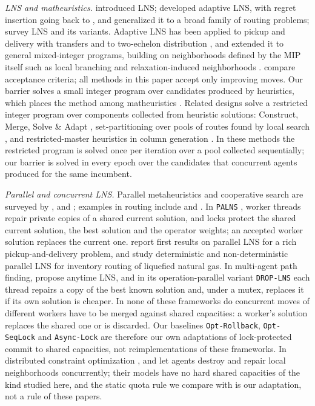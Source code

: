 \documentclass[a4paper,fleqn]{cas-sc}
\begin{document}
\textit{LNS and matheuristics.} \citet{shaw1998} introduced LNS; \citet{ropke2006} developed adaptive LNS, with regret insertion going back to \citet{potvin1993}, and \citet{pisinger2007} generalized it to a broad family of routing problems; \citet{pisinger2010} survey LNS and its variants. Adaptive LNS has been applied to pickup and delivery with transfers \citep{masson2013} and to two-echelon distribution \citep{hemmelmayr2012}, and \citet{hendel2022} extended it to general mixed-integer programs, building on neighborhoods defined by the MIP itself such as local branching \citep{fischetti2003} and relaxation-induced neighborhoods \citep{danna2005}. \citet{santini2018} compare acceptance criteria; all methods in this paper accept only improving moves. Our barrier solves a small integer program over candidates produced by heuristics, which places the method among matheuristics \citep{maniezzo2009}. Related designs solve a restricted integer program over components collected from heuristic solutions: Construct, Merge, Solve \& Adapt \citep{blum2016}, set-partitioning over pools of routes found by local search \citep{subramanian2013}, and restricted-master heuristics in column generation \citep{joncour2010, sadykov2019}. In these methods the restricted program is solved once per iteration over a pool collected sequentially; our barrier is solved in every epoch over the candidates that concurrent agents produced for the same incumbent.

\textit{Parallel and concurrent LNS.} Parallel metaheuristics and cooperative search are surveyed by \citet{alba2005}, \citet{crainic2019} and \citet{schryen2020}; examples in routing include \citet{groer2011} and \citet{lahrichi2015}. In \texttt{PALNS} \citep{ropke2009}, worker threads repair private copies of a shared current solution, and locks protect the shared current solution, the best solution and the operator weights; an accepted worker solution replaces the current one. \citet{bartodziej2010} report first results on parallel LNS for a rich pickup-and-delivery problem, and \citet{asokan2014} study deterministic and non-deterministic parallel LNS for inventory routing of liquefied natural gas. In multi-agent path finding, \citet{li2021} propose anytime LNS, and in its operation-parallel variant \texttt{DROP-LNS} \citep{chan2024} each thread repairs a copy of the best known solution and, under a mutex, replaces it if its own solution is cheaper. In none of these frameworks do concurrent moves of different workers have to be merged against shared capacities: a worker's solution replaces the shared one or is discarded. Our baselines \texttt{Opt-Rollback}, \texttt{Opt-SeqLock} and \texttt{Async-Lock} are therefore our own adaptations of lock-protected commit to shared capacities, not reimplementations of these frameworks. In distributed constraint optimization \citep{fioretto2018}, \citet{fioretto2017} and \citet{hoang2018} let agents destroy and repair local neighborhoods concurrently; their models have no hard shared capacities of the kind studied here, and the static quota rule we compare with is our adaptation, not a rule of these papers.
\end{document}
